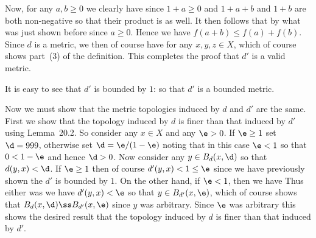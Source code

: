 {{    Now, for any $a,b \geq 0$ we clearly have
    since $1+a \geq 0$ and $1 + a + b$ and $1 + b$ are both non-negative so that their product is as well.
    It then follows that
    by what was just shown before since $a \geq 0$.
    Hence we have $f(a+b) \leq f(a) + f(b)$.
    Since $d$ is a metric, we then of course have
    for any $x,y,z \in X$, which of course shows part~(3) of the definition.
    This completes the proof that $d'$ is a valid metric.

    It is easy to see that $d'$ is bounded by $1$:
    so that $d'$ is a bounded metric.
    
    Now we must show that the metric topologies induced by $d$ and $d'$ are the same.
    First we show that the topology induced by $d$ is finer than that induced by $d'$ using Lemma~20.2.
    So consider any $x \in X$ and any $\e > 0$.
    If $\e \geq 1$ set $\d = 999$, otherwise set $\d = \e/(1-\e)$ noting that in this case $\e < 1$ so that $0 < 1-\e$ and hence $\d > 0$.
    Now consider any $y \in B_d(x, \d)$ so that $d(y,x) < \d$.
    If $\e \geq 1$ then of course $d'(y,x) < 1 \leq \e$ since we have previously shown the $d'$ is bounded by $1$.
    On the other hand, if $\e < 1$, then we have
    Thus either was we have $d'(y,x) < \e$ so that $y \in B_{d'}(x, \e)$, which of course shows that $B_d(x,\d) \ss B_{d'}(x,\e)$ since $y$ was arbitrary.
    Since $\e$ was arbitrary this shows the desired result that the topology induced by $d$ is finer than that induced by $d'$.

}}
